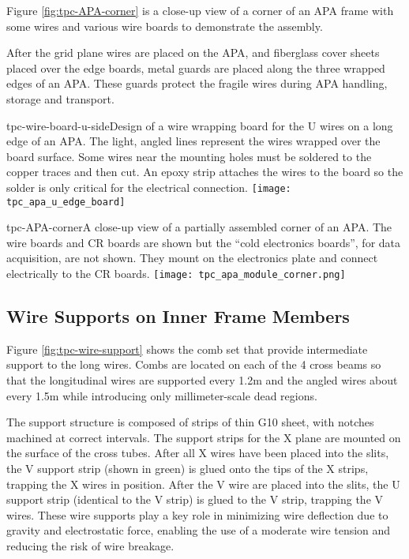Figure \ref{fig:tpc-APA-corner} is a close-up view of a corner of an APA frame with some wires and various wire boards to demonstrate the assembly.

After the grid plane wires are placed on the APA, and fiberglass cover sheets placed over the edge boards, metal guards are placed along the three wrapped edges of an APA. These guards protect the fragile wires during APA handling, storage and transport.



\begin{cdrfigure}{tpc-wire-board-u-side}{Design of a wire wrapping board for the U wires on a long edge of an APA. The light, angled lines represent the wires wrapped over the board surface. Some wires near the mounting holes must be soldered to the copper traces and then cut.  An epoxy strip attaches the wires to the board so the solder is only critical for the electrical connection.}
\texttt{[image: tpc\_apa\_u\_edge\_board]}
\end{cdrfigure}


\begin{cdrfigure}{tpc-APA-corner}{A close-up view of a partially assembled corner of an APA.  The wire boards and CR boards are shown but the ``cold electronics boards'', for data acquisition, are not shown.  They mount on the electronics plate and connect electrically to the CR boards.}
\texttt{[image: tpc\_apa\_module\_corner.png]}
\end{cdrfigure}


\subsection{Wire Supports on Inner Frame Members}

Figure \ref{fig:tpc-wire-support} shows the comb set that provide intermediate support to the long wires.  Combs are located on each of the 4 cross beams so that the longitudinal wires are supported every 1.2m and the angled wires about every 1.5m while introducing only millimeter-scale dead regions.

The support structure is composed of strips of thin G10 sheet, with notches machined at correct intervals. The support strips for the X plane are mounted on the surface of the cross tubes.  After all X wires have been placed into the slits, the V support strip (shown in green) is glued onto the tips of the X strips, trapping the X wires in position.  After the V wire are placed into the slits, the U support strip (identical to the V strip) is glued to the V strip, trapping the V wires.  These wire supports play a key role in minimizing wire deflection due to gravity and electrostatic force, enabling the use of a moderate wire tension and reducing the risk of wire breakage.



